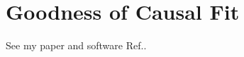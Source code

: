 \chapter{Goodness of Causal Fit}
\label{ch-good-causal-fit}
See my paper 
and software Ref.\cite{tucci-gcf}.
